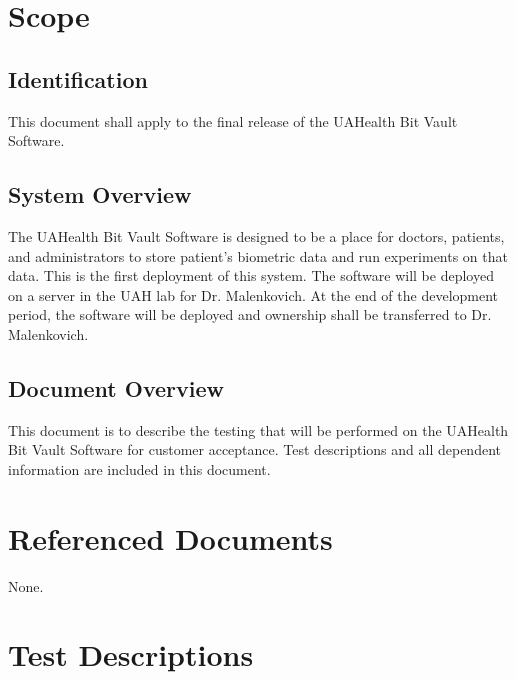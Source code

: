 \documentclass[letterpaper,10pt,english]{sphinxmanual}
\begin{document}
\section{Scope}
\label{STD/software_test_description:scope}

\subsection{Identification}
\label{STD/software_test_description:identification}
This document shall apply to the final release of the UAHealth Bit Vault Software.


\subsection{System Overview}
\label{STD/software_test_description:system-overview}
The UAHealth Bit Vault Software is designed to be a place for doctors, patients, and administrators to store patient’s
biometric data and run experiments on that data. This is the first deployment of this system.
The software will be deployed on a server in the UAH lab for Dr. Malenkovich. At the end of the development period,
the software will be deployed and ownership shall be transferred to Dr. Malenkovich.


\subsection{Document Overview}
\label{STD/software_test_description:document-overview}
This document is to describe the testing that will be performed on the UAHealth Bit Vault Software for customer acceptance.
Test descriptions and all dependent information are included in this document.


\section{Referenced Documents}
\label{STD/software_test_description:referenced-documents}
None.


\section{Test Descriptions}
\label{STD/software_test_description:test-descriptions}
\end{document}

